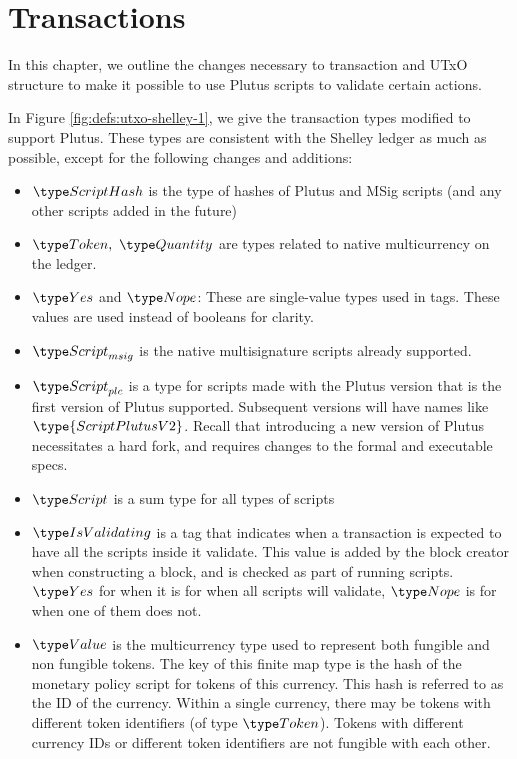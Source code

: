 \section{Transactions}
\label{sec:transactions}

In this chapter, we outline the changes necessary to transaction and
UTxO structure to make it possible to use Plutus scripts to validate
certain actions.

In Figure \ref{fig:defs:utxo-shelley-1}, we give the transaction types modified
to support Plutus. These types are consistent with the Shelley ledger
as much as possible,
except for the following changes and additions:

\begin{itemize}
  \item $\ScriptHash$ is the type of hashes
  of Plutus and MSig scripts (and any other scripts added in the future)

  \item $\Token,~\Quantity$ are types
  related to native multicurrency on the ledger.

  \item $\Yes$ and $\Nope$: These are single-value types used in tags. These
  values are used instead of booleans for clarity.

  \item  $\ScriptMSig$ is the native multisignature scripts already supported.

  \item $\ScriptPlutus$ is a type for scripts made with the Plutus version
  that is the first version of Plutus supported. Subsequent versions will
  have names like $\type{ScriptPlutusV2}$. Recall that introducing
  a new version of Plutus necessitates a hard fork, and requires changes
  to the formal and executable specs.

  \item $\Script$ is a sum type for all types of scripts

  \item $\IsValidating$ is a tag that indicates when a transaction is
  expected to have all the scripts inside it validate.
  This value is added by the block creator when
  constructing a block, and is checked as part of running scripts.
  $\Yes$ for when it is for when all scripts will validate,
  $\Nope$ is for when one of them does not.

  \item $\Value$ is the multicurrency type used to represent
  both fungible and non fungible tokens. The key of this finite map type is
  the hash of the monetary policy script for tokens of this currency.
  This hash is referred to as the ID of the currency. Within a single
  currency, there may be tokens with different token identifiers
  (of type $\Token$). Tokens with different currency IDs
  or different token identifiers are not fungible with each other.


\end{itemize}
